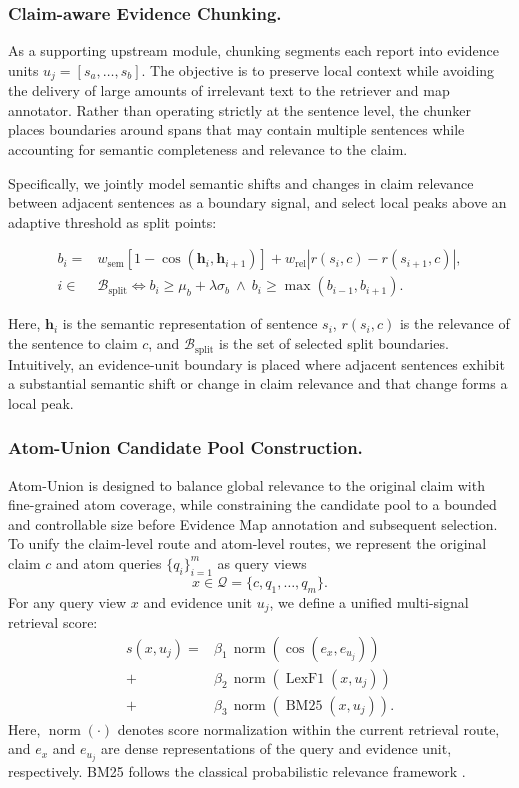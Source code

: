 \documentclass[letterpaper]{article}
\begin{document}
\subsubsection{Claim-aware Evidence Chunking.}

As a supporting upstream module, chunking segments each report into evidence units $u_j=[s_a,\ldots,s_b]$. The objective is to preserve local context while avoiding the delivery of large amounts of irrelevant text to the retriever and map annotator. Rather than operating strictly at the sentence level, the chunker places boundaries around spans that may contain multiple sentences while accounting for semantic completeness and relevance to the claim.

Specifically, we jointly model semantic shifts and changes in claim relevance between adjacent sentences as a boundary signal, and select local peaks above an adaptive threshold as split points:

\[
\begin{aligned}
    b_i=&w_{\mathrm{sem}}\!\left[1-\cos(\mathbf h_i,\mathbf h_{i+1})\right]+w_{\mathrm{rel}}\!\left|r(s_i,c)-r(s_{i+1},c)\right|,\\
    i\in&\mathcal B_{\mathrm{split}}\iff b_i\ge \mu_b+\lambda\sigma_b\ \land\ b_i\ge\max(b_{i-1},b_{i+1}).
\end{aligned}
\]

Here, $\mathbf h_i$ is the semantic representation of sentence $s_i$, $r(s_i,c)$ is the relevance of the sentence to claim $c$, and $\mathcal B_{\mathrm{split}}$ is the set of selected split boundaries. Intuitively, an evidence-unit boundary is placed where adjacent sentences exhibit a substantial semantic shift or change in claim relevance and that change forms a local peak.

\subsubsection{Atom-Union Candidate Pool Construction.}

Atom-Union is designed to balance global relevance to the original claim with fine-grained atom coverage, while constraining the candidate pool to a bounded and controllable size before Evidence Map annotation and subsequent selection. To unify the claim-level route and atom-level routes, we represent the original claim $c$ and atom queries $\{q_i\}_{i=1}^{m}$ as query views
\[
x\in\mathcal Q=\{c,q_1,\ldots,q_m\}.
\]
For any query view $x$ and evidence unit $u_j$, we define a unified multi-signal retrieval score:
\[
\begin{aligned}
s(x,u_j)
={}&\beta_1\,\operatorname{norm}\!\left(\cos(e_x,e_{u_j})\right)\\
+&\beta_2\,\operatorname{norm}\!\left(\operatorname{LexF1}(x,u_j)\right)\\
+&\beta_3\,\operatorname{norm}\!\left(\operatorname{BM25}(x,u_j)\right).
\end{aligned}
\]
Here, $\operatorname{norm}(\cdot)$ denotes score normalization within the current retrieval route, and $e_x$ and $e_{u_j}$ are dense representations of the query and evidence unit, respectively. BM25 follows the classical probabilistic relevance framework \citep{Robertson2009BM25}.
\end{document}
